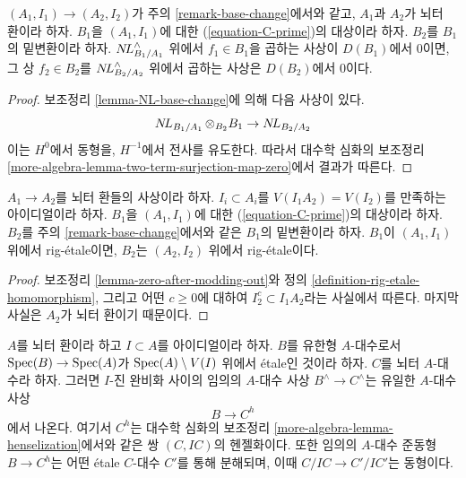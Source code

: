 \begin{lemma}
\label{lemma-zero-after-modding-out}
$(A_1, I_1) \to (A_2, I_2)$가 주의 \ref{remark-base-change}에서와 같고,
$A_1$과 $A_2$가 뇌터 환이라 하자.
$B_1$을 $(A_1, I_1)$에 대한 (\ref{equation-C-prime})의 대상이라 하자.
$B_2$를 $B_1$의 밑변환이라 하자.
$\mathop{N\!L}\nolimits^\wedge_{B_1/A_1}$ 위에서 $f_1 \in B_1$을 곱하는 사상이 $D(B_1)$에서 0이면,
그 상 $f_2 \in B_2$를 $\mathop{N\!L}\nolimits^\wedge_{B_2/A_2}$ 위에서 곱하는 사상은 $D(B_2)$에서 0이다.
\end{lemma}

\begin{proof}
보조정리 \ref{lemma-NL-base-change}에 의해 다음 사상이 있다.
$$
\mathop{N\!L}\nolimits_{B_1/A_1} \otimes_{B_2} B_1 \to \mathop{N\!L}\nolimits_{B_2/A_2}
$$
이는 $H^0$에서 동형을, $H^{-1}$에서 전사를 유도한다.
따라서 대수학 심화의 보조정리 \ref{more-algebra-lemma-two-term-surjection-map-zero}에서 결과가 따른다.
\end{proof}

\begin{lemma}
\label{lemma-base-change-rig-etale-homomorphism}
$A_1 \to A_2$를 뇌터 환들의 사상이라 하자.
$I_i \subset A_i$를 $V(I_1A_2) = V(I_2)$를 만족하는 아이디얼이라 하자.
$B_1$을 $(A_1, I_1)$에 대한 (\ref{equation-C-prime})의 대상이라 하자.
$B_2$를 주의 \ref{remark-base-change}에서와 같은 $B_1$의 밑변환이라 하자.
$B_1$이 $(A_1, I_1)$ 위에서 rig-\'etale이면,
$B_2$는 $(A_2, I_2)$ 위에서 rig-\'etale이다.
\end{lemma}

\begin{proof}
보조정리 \ref{lemma-zero-after-modding-out}와 정의 \ref{definition-rig-etale-homomorphism},
그리고 어떤 $c \geq 0$에 대하여 $I_2^c \subset I_1A_2$라는 사실에서 따른다.
마지막 사실은 $A_2$가 뇌터 환이기 때문이다.
\end{proof}

\begin{lemma}
\label{lemma-fully-faithful-etale-over-complement}
$A$를 뇌터 환이라 하고 $I \subset A$를 아이디얼이라 하자.
$B$를 유한형 $A$-대수로서 $\mathop{\mathrm{Spec}}(B) \to \mathop{\mathrm{Spec}}(A)$가
$\mathop{\mathrm{Spec}}(A) \setminus V(I)$ 위에서 \'etale인 것이라 하자.
$C$를 뇌터 $A$-대수라 하자.
그러면 $I$-진 완비화 사이의 임의의 $A$-대수 사상 $B^\wedge \to C^\wedge$는
유일한 $A$-대수 사상
$$
B \longrightarrow C^h
$$
에서 나온다. 여기서 $C^h$는 대수학 심화의 보조정리
\ref{more-algebra-lemma-henselization}에서와 같은 쌍 $(C, IC)$의 헨젤화이다.
또한 임의의 $A$-대수 준동형 $B \to C^h$는 어떤 \'etale $C$-대수 $C'$를 통해 분해되며,
이때 $C/IC \to C'/IC'$는 동형이다.
\end{lemma}

